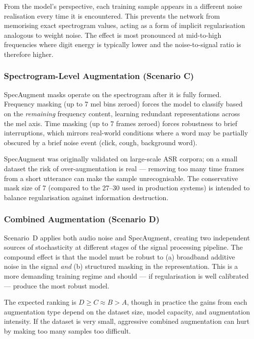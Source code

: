 \documentclass[12pt, a4paper]{article}
\begin{document}
From the model's perspective, each training sample appears in a different noise
realisation every time it is encountered. This prevents the network from memorising
exact spectrogram values, acting as a form of implicit regularisation analogous to
weight noise. The effect is most pronounced at mid-to-high frequencies where digit
energy is typically lower and the noise-to-signal ratio is therefore higher.

\subsubsection{Spectrogram-Level Augmentation (Scenario C)}

SpecAugment masks operate on the spectrogram after it is fully formed. Frequency
masking (up to 7 mel bins zeroed) forces the model to classify based on the
\emph{remaining} frequency content, learning redundant representations across the
mel axis. Time masking (up to 7 frames zeroed) forces robustness to brief
interruptions, which mirrors real-world conditions where a word may be partially
obscured by a brief noise event (click, cough, background word).

SpecAugment was originally validated on large-scale ASR corpora; on a small dataset
the risk of over-augmentation is real --- removing too many time frames from a short
utterance can make the sample unrecognisable. The conservative mask size of 7
(compared to the 27--30 used in production systems) is intended to balance
regularisation against information destruction.

\subsubsection{Combined Augmentation (Scenario D)}

Scenario~D applies both audio noise and SpecAugment, creating two independent sources
of stochasticity at different stages of the signal processing pipeline. The compound
effect is that the model must be robust to (a) broadband additive noise in the signal
\emph{and} (b) structured masking in the representation. This is a more demanding
training regime and should --- if regularisation is well calibrated --- produce the
most robust model.

The expected ranking is $D \geq C \approx B > A$, though in practice the gains from
each augmentation type depend on the dataset size, model capacity, and augmentation
intensity. If the dataset is very small, aggressive combined augmentation can hurt by
making too many samples too difficult.
\end{document}
